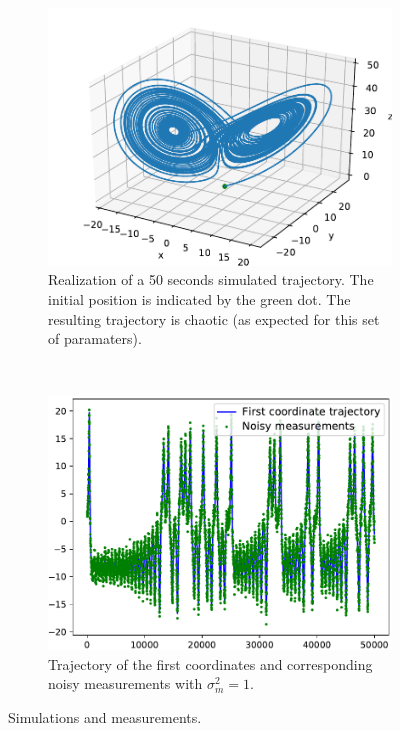 \documentclass[english, DIV=13]{scrartcl}
\begin{document}
\begin{figure}
    \centering
    \begin{subfigure}{0.49\textwidth}
        \includegraphics[width=\textwidth]{figures/q2-3d-trajectory}
        \caption{Realization of a 50 seconds simulated trajectory. The initial
        position is indicated by the green dot. The resulting trajectory is chaotic
        (as expected for this set of paramaters).}
        \label{fig:q2-3d-trajectory}
    \end{subfigure}%
    ~
    \begin{subfigure}{0.49\textwidth}
        \includegraphics[width=\textwidth]{figures/q2-mes-vs-real}
        \caption{Trajectory of the first coordinates and corresponding noisy
        measurements with $\sigma^2_m = 1$.}
        \label{fig:q2-mes-vs-real}
    \end{subfigure}
    \caption{Simulations and measurements.}
\end{figure}
\end{document}
